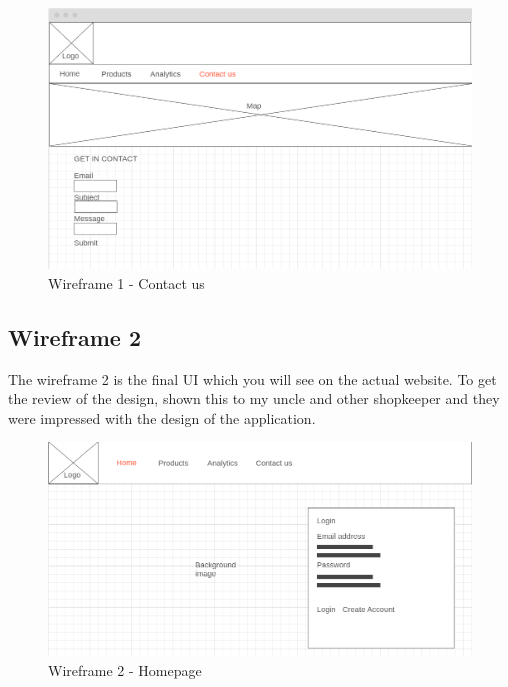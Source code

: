 \begin{figure}[H]
\centering
    \includegraphics[scale=0.5]
    {wireframe1/contactus.png}
    \caption{Wireframe 1 - Contact us}
    \label{fig:Wireframe 1 - Contact us}
\end{figure}

\subsection{Wireframe 2}
The wireframe 2 is the final UI which you will see on the actual website. To get the review of the design, shown this to my uncle and other shopkeeper and they were impressed with the design of the application.
\begin{figure}[H]
\centering
    \includegraphics[scale=0.4]
    {wireframe2/homepage2.png}
    \caption{Wireframe 2 - Homepage}
    \label{fig:Wireframe 2 - Homepage}
\end{figure}

